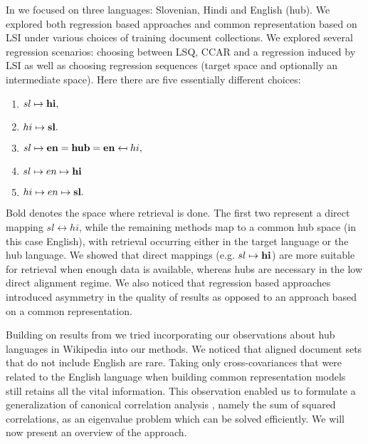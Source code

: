 \documentclass{article} %
\begin{document}
In \cite{sikdd} we focused on three languages: Slovenian, Hindi and English (hub). We explored both regression based approaches and common representation based on LSI under various choices of training document collections. We explored several regression scenarios: choosing between LSQ, CCAR and a regression induced by LSI as well as choosing regression sequences (target space and optionally an intermediate space). Here there are five essentially different choices:
\begin{enumerate}
\item $sl\mapsto {\bf hi},$
\item $hi\mapsto {\bf sl}.$
\item $sl\mapsto {\bf en = hub = en} \mapsfrom hi,$
\item $sl\mapsto en \mapsto {\bf hi}$
\item $hi\mapsto en \mapsto {\bf sl}.$
\end{enumerate}
Bold denotes the space where retrieval is done. The first two represent a direct mapping $sl \leftrightarrow hi$, while the remaining methods map to a common hub space (in this case English), with retrieval occurring either in the target language or the hub language. We showed that direct mappings (e.g. $sl\mapsto {\bf hi}$) are more suitable for retrieval when enough data is available, whereas hubs are necessary in the low direct alignment regime. We also noticed that regression based approaches introduced asymmetry in the quality of results as opposed to an approach based on a common representation.

Building on results from \cite{sikdd} we tried incorporating our observations about hub languages in Wikipedia into our methods. We noticed that aligned document sets that do not include English are rare. Taking only cross-covariances that were related to the English language when building common representation models still retains all the vital information. This observation enabled us to formulate a generalization of canonical correlation analysis \cite{Kettenring}, namely the sum of squared correlations, as an eigenvalue problem which can be solved efficiently. We will now present an overview of the approach.
\end{document}

